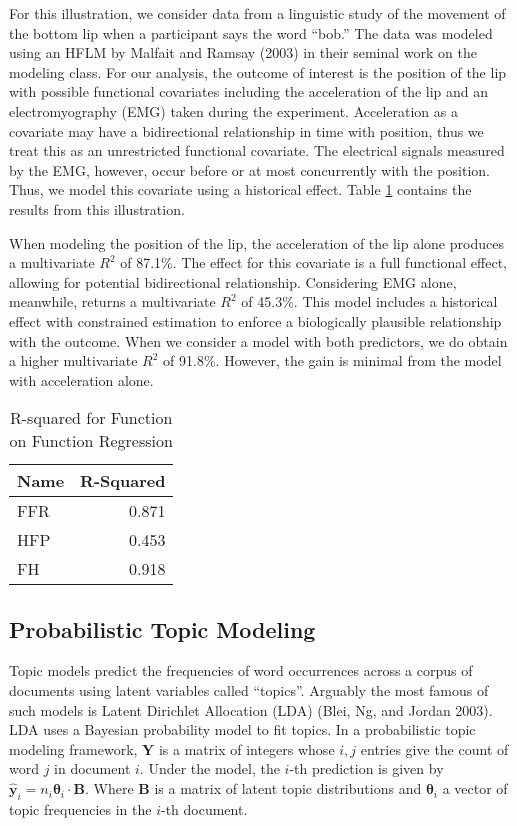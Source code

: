 For this illustration, we consider data from a linguistic study of the movement of the bottom lip when a participant says the word ``bob.'' The data was modeled using an HFLM by Malfait and Ramsay (2003) in their seminal work on the modeling class. For our analysis, the outcome of interest is the position of the lip with possible functional covariates including the acceleration of the lip and an electromyography (EMG) taken during the experiment. Acceleration as a covariate may have a bidirectional relationship in time with position, thus we treat this as an unrestricted functional covariate. The electrical signals measured by the EMG, however, occur before or at most concurrently with the position. Thus, we model this covariate using a historical effect. Table \ref{tab:ffr} contains the results from this illustration.

When modeling the position of the lip, the acceleration of the lip alone produces a multivariate \(R^2\) of 87.1\%. The effect for this covariate is a full functional effect, allowing for potential bidirectional relationship. Considering EMG alone, meanwhile, returns a multivariate \(R^2\) of 45.3\%. This model includes a historical effect with constrained estimation to enforce a biologically plausible relationship with the outcome. When we consider a model with both predictors, we do obtain a higher multivariate \(R^2\) of 91.8\%. However, the gain is minimal from the model with acceleration alone.

\begin{table}

\caption{\label{tab:ffr}R-squared for Function on Function Regression}
\centering
\begin{tabular}[t]{l|r}
\hline
Name & R-Squared\\
\hline
FFR & 0.871\\
\hline
HFP & 0.453\\
\hline
FH & 0.918\\
\hline
\end{tabular}
\end{table}

\hypertarget{probabilistic-topic-modeling}{%
\subsection{Probabilistic Topic Modeling}\label{probabilistic-topic-modeling}}

Topic models predict the frequencies of word occurrences across a corpus of documents using latent variables called ``topics''. Arguably the most famous of such models is Latent Dirichlet Allocation (LDA) (Blei, Ng, and Jordan 2003). LDA uses a Bayesian probability model to fit topics. In a probabilistic topic modeling framework, \(\boldsymbol{Y}\) is a matrix of integers whose \(i,j\) entries give the count of word \(j\) in document \(i\). Under the model, the \(i\)-th prediction is given by \(\hat{\boldsymbol{y}}_i = n_i \boldsymbol{\theta}_i \cdot \boldsymbol{B}\). Where \(\boldsymbol{B}\) is a matrix of latent topic distributions and \(\boldsymbol{\theta}_i\) a vector of topic frequencies in the \(i\)-th document.

